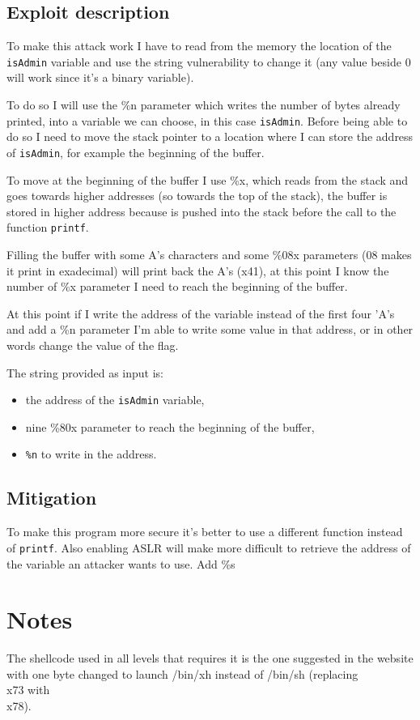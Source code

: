 \documentclass[a4paper,12pt]{article}
\begin{document}
\subsection{Exploit description}

To make this attack work I have to read from the memory the location of the \texttt{isAdmin} variable and use the string vulnerability to change it (any value beside 0 will work since it's a binary variable). 

To do so I will use the \%n parameter which writes the number of bytes already printed, into a variable we can choose, in this case \texttt{isAdmin}. Before being able to do so I need to move the stack pointer to a location where I can store the address of \texttt{isAdmin}, for example the beginning of the buffer.

To move at the beginning of the buffer I use \%x, which reads from the stack and goes towards higher addresses (so towards the top of the stack), the buffer is stored in higher address because is pushed into the stack before the call to the function \texttt{printf}.

Filling the buffer with some A's characters and some \%08x parameters (08 makes it print in exadecimal) will print back the A's (x41), at this point I know the number of \%x parameter I need to reach the beginning of the buffer.

At this point if I write the address of the variable instead of the first four 'A's and add a \%n parameter I'm able to write some value in that address, or in other words change the value of the flag.

The string provided as input is:
\begin{itemize}
\item the address of the \texttt{isAdmin} variable,
\item nine \%80x parameter to reach the beginning of the buffer,
\item \texttt{\%n} to write in the address.
\end{itemize}


\subsection{Mitigation}

To make this program more secure it's better to use a different function instead of \texttt{printf}.
Also enabling ASLR will make more difficult to retrieve the address of the variable an attacker wants to use. 
Add \%s 

\newpage
\section{Notes}

The shellcode used in all levels that requires it is the one suggested in the website with one byte changed to launch /bin/xh instead of /bin/sh (replacing \\x73 with \\x78).
\end{document}
